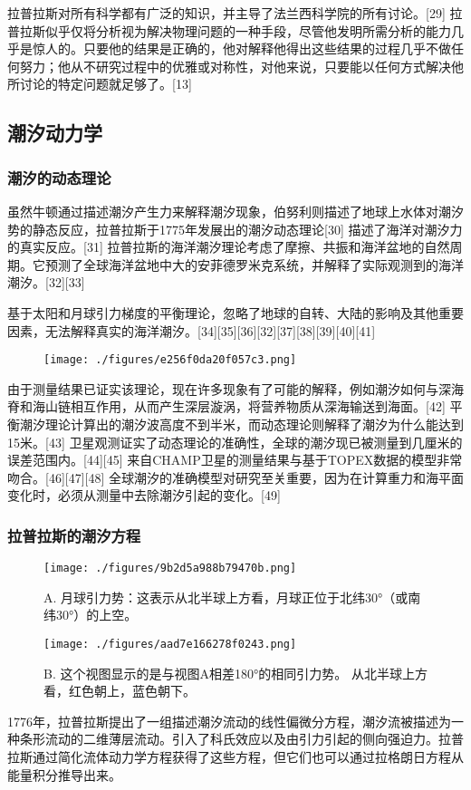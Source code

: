 拉普拉斯对所有科学都有广泛的知识，并主导了法兰西科学院的所有讨论。[29] 拉普拉斯似乎仅将分析视为解决物理问题的一种手段，尽管他发明所需分析的能力几乎是惊人的。只要他的结果是正确的，他对解释他得出这些结果的过程几乎不做任何努力；他从不研究过程中的优雅或对称性，对他来说，只要能以任何方式解决他所讨论的特定问题就足够了。[13]
\subsection{潮汐动力学}    
\subsubsection{潮汐的动态理论}  
虽然牛顿通过描述潮汐产生力来解释潮汐现象，伯努利则描述了地球上水体对潮汐势的静态反应，拉普拉斯于1775年发展出的潮汐动态理论[30] 描述了海洋对潮汐力的真实反应。[31] 拉普拉斯的海洋潮汐理论考虑了摩擦、共振和海洋盆地的自然周期。它预测了全球海洋盆地中大的安菲德罗米克系统，并解释了实际观测到的海洋潮汐。[32][33]

基于太阳和月球引力梯度的平衡理论，忽略了地球的自转、大陆的影响及其他重要因素，无法解释真实的海洋潮汐。[34][35][36][32][37][38][39][40][41]
\begin{figure}[ht]
\centering
\texttt{[image: ./figures/e256f0da20f057c3.png]}
\caption{} \label{fig_LPLS_3}
\end{figure}
由于测量结果已证实该理论，现在许多现象有了可能的解释，例如潮汐如何与深海脊和海山链相互作用，从而产生深层漩涡，将营养物质从深海输送到海面。[42] 平衡潮汐理论计算出的潮汐波高度不到半米，而动态理论则解释了潮汐为什么能达到15米。[43] 卫星观测证实了动态理论的准确性，全球的潮汐现已被测量到几厘米的误差范围内。[44][45] 来自CHAMP卫星的测量结果与基于TOPEX数据的模型非常吻合。[46][47][48] 全球潮汐的准确模型对研究至关重要，因为在计算重力和海平面变化时，必须从测量中去除潮汐引起的变化。[49]
\subsubsection{拉普拉斯的潮汐方程}
\begin{figure}[ht]
\centering
\texttt{[image: ./figures/9b2d5a988b79470b.png]}
\caption{A. 月球引力势：这表示从北半球上方看，月球正位于北纬30°（或南纬30°）的上空。} \label{fig_LPLS_4}
\end{figure}
\begin{figure}[ht]
\centering
\texttt{[image: ./figures/aad7e166278f0243.png]}
\caption{B. 这个视图显示的是与视图A相差180°的相同引力势。 从北半球上方看，红色朝上，蓝色朝下。} \label{fig_LPLS_5}
\end{figure}
1776年，拉普拉斯提出了一组描述潮汐流动的线性偏微分方程，潮汐流被描述为一种条形流动的二维薄层流动。引入了科氏效应以及由引力引起的侧向强迫力。拉普拉斯通过简化流体动力学方程获得了这些方程，但它们也可以通过拉格朗日方程从能量积分推导出来。

